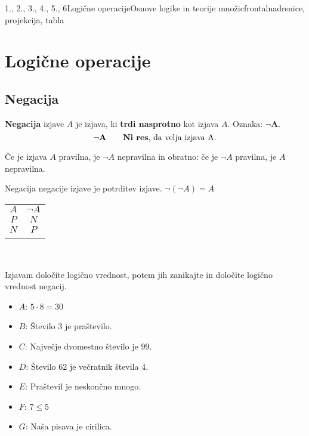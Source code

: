 \begin{priprava}{1., 2., 3., 4., 5., 6}{}{Logične operacije}{Osnove logike in teorije množic}{frontalna}{drsnice, projekcija, tabla}


    \section{Logične operacije}

    \subsection{Negacija}
      \textbf{Negacija} izjave $A$ je izjava, ki \textbf{trdi nasprotno} 
      kot izjava $A$.
      Oznaka: $\mathbf{\lnot A}$.
      $$ \mathbf{\lnot A} \quad \quad \textmd{\textbf{Ni res}, da velja izjava A.}$$
   

            
              Če je izjava $A$ pravilna, je $\lnot A$ nepravilna in obratno: 
              če je $\lnot A$ pravilna, je $A$ nepravilna.
           
            
              Negacija negacije izjave je potrditev izjave. \quad $\lnot(\lnot A)=A$
           

      \begin{table}[H]
          \centering
          \begin{tabular}{||c|c||} 
          \hhline{|t:==:t|}
          \rowcolor[rgb]{0.843,0.718,0.718} $A$ & $\lnot A$  \\ 
          \hhline{|:==:|}
          $P$                                   & $N$                       \\ 
          \hline
          $N$                                   & $P$                       \\
          \hhline{|b:==:b|}
          \end{tabular}                    
      \end{table}                


~

   \begin{naloga}
      Izjavam določite logično vrednost, potem jih zanikajte in določite logično vrednost negacij.
      \begin{itemize}
          \item $A$: $5 \cdot 8 = 30$
          \item $B$: Število $3$ je praštevilo.
          \item $C$: Največje dvomestno število je $99$.
          \item $D$: Število $62$ je večratnik števila $4$.
          \item $E$: Praštevil je neskončno mnogo.
          \item $F$: $7 \leq 5$
          \item $G$: Naša pisava je cirilica.
      \end{itemize}
  \end{naloga}


\end{priprava}
